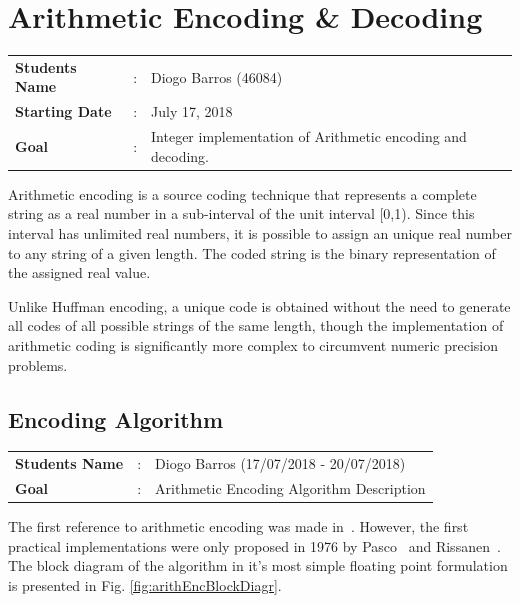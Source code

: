 \clearpage
\section{Arithmetic Encoding \& Decoding}

\begin{refsection}

\begin{tcolorbox}	
\begin{tabular}{p{2.75cm} p{0.2cm} p{10.5cm}} 	
\textbf{Students Name}  &:& Diogo Barros (46084) \\
\textbf{Starting Date} &:& July 17, 2018\\
\textbf{Goal}          &:& Integer implementation of Arithmetic encoding and decoding.
\end{tabular}
\end{tcolorbox}

Arithmetic encoding is a source coding technique that represents a complete string as a real number in a sub-interval of the unit interval [0,1). Since this interval has unlimited real numbers, it is possible to assign an unique real number to any string of a given length. The coded string is the binary representation of the assigned real value.

Unlike Huffman encoding, a unique code is obtained without the need to generate all codes of all possible strings of the same length, though the implementation of arithmetic coding is significantly more complex to circumvent numeric precision problems.

\subsection{Encoding Algorithm}

\begin{tcolorbox}	
	\begin{tabular}{p{2.75cm} p{0.2cm} p{10.5cm}} 	
		\textbf{Students Name}  &:& Diogo Barros (17/07/2018 - 20/07/2018)\\
		\textbf{Goal}          &:& Arithmetic Encoding Algorithm Description
	\end{tabular}
\end{tcolorbox}

The first reference to arithmetic encoding was made in~\cite{Abramson63}. However, the first practical implementations were only proposed in 1976 by Pasco~\cite{Pasco76} and Rissanen~\cite{Rissanen76}. The block diagram of the algorithm in it's most simple floating point formulation is presented in Fig. \ref{fig:arithEncBlockDiagr}.


\end{refsection}
